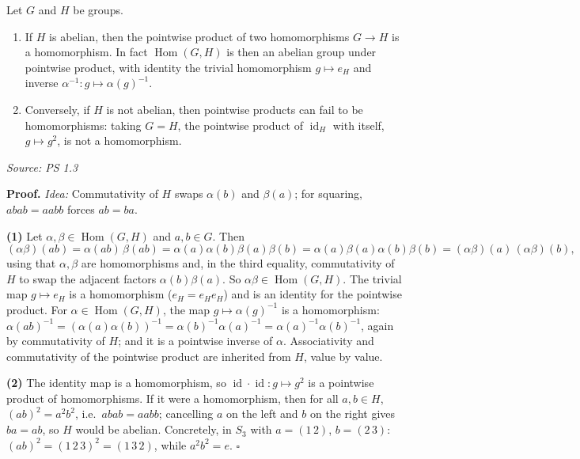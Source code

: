 \documentclass[11pt]{report}
\renewenvironment{proof}[1][Proof]{\noindent\textbf{#1.} }{\hfill$\square$\par\vspace{5pt}}
\newcommand{\srcline}[1]{\par\hfill{\footnotesize\textit{Source: #1}}}
\begin{document}
\begin{propbox}\label{prop:pointwise-products-homomorphisms}
Let $G$ and $H$ be groups.
\begin{enumerate}
    \item If $H$ is abelian, then the pointwise product of two homomorphisms $G \to H$ is a homomorphism. In fact $\operatorname{Hom}(G, H)$ is then an abelian group under pointwise product, with identity the trivial homomorphism $g \mapsto e_H$ and inverse $\alpha^{-1}: g \mapsto \alpha(g)^{-1}$.
    \item Conversely, if $H$ is not abelian, then pointwise products can fail to be homomorphisms: taking $G = H$, the pointwise product of $\operatorname{id}_H$ with itself, $g \mapsto g^2$, is not a homomorphism.
\end{enumerate}
\srcline{PS 1.3}
\end{propbox}

\begin{proof}
\textit{Idea:} Commutativity of $H$ swaps $\alpha(b)$ and $\beta(a)$; for squaring, $abab = aabb$ forces $ab = ba$.\par
\textbf{(1)} Let $\alpha, \beta \in \operatorname{Hom}(G, H)$ and $a, b \in G$. Then
\[ (\alpha\beta)(ab) = \alpha(ab)\,\beta(ab) = \alpha(a)\alpha(b)\beta(a)\beta(b) = \alpha(a)\beta(a)\alpha(b)\beta(b) = (\alpha\beta)(a)\,(\alpha\beta)(b), \]
using that $\alpha, \beta$ are homomorphisms and, in the third equality, commutativity of $H$ to swap the adjacent factors $\alpha(b)\beta(a)$. So $\alpha\beta \in \operatorname{Hom}(G, H)$. The trivial map $g \mapsto e_H$ is a homomorphism ($e_H = e_H e_H$) and is an identity for the pointwise product. For $\alpha \in \operatorname{Hom}(G,H)$, the map $g \mapsto \alpha(g)^{-1}$ is a homomorphism: $\alpha(ab)^{-1} = (\alpha(a)\alpha(b))^{-1} = \alpha(b)^{-1}\alpha(a)^{-1} = \alpha(a)^{-1}\alpha(b)^{-1}$, again by commutativity of $H$; and it is a pointwise inverse of $\alpha$. Associativity and commutativity of the pointwise product are inherited from $H$, value by value.

\textbf{(2)} The identity map is a homomorphism, so $\operatorname{id}\cdot\operatorname{id}: g \mapsto g^2$ is a pointwise product of homomorphisms. If it were a homomorphism, then for all $a, b \in H$, $(ab)^2 = a^2 b^2$, i.e.\ $abab = aabb$; cancelling $a$ on the left and $b$ on the right gives $ba = ab$, so $H$ would be abelian. Concretely, in $S_3$ with $a = (1\,2)$, $b = (2\,3)$: $(ab)^2 = (1\,2\,3)^2 = (1\,3\,2)$, while $a^2 b^2 = e$.
\end{proof}
\end{document}
